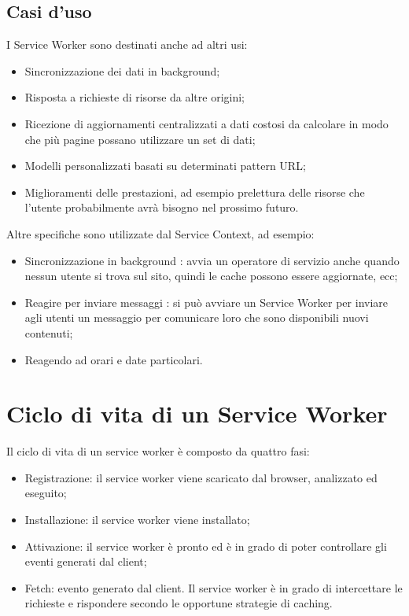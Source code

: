 \documentclass[11pt ,a4paper , twoside , openright ]{article}
\begin{document}
\subsection{Casi d'uso}
I Service Worker sono destinati anche ad altri usi:
\begin{itemize}
	\item Sincronizzazione dei dati in background;
	\item Risposta a richieste di risorse da altre origini;
	\item Ricezione di aggiornamenti centralizzati a dati costosi da calcolare in modo che più pagine possano utilizzare un set di dati;
	\item Modelli personalizzati basati su determinati pattern URL;
	\item Miglioramenti delle prestazioni, ad esempio prelettura delle risorse che l'utente probabilmente avrà bisogno nel prossimo futuro.
\end{itemize}
Altre specifiche sono utilizzate dal Service Context, ad esempio:
\begin{itemize}
	\item Sincronizzazione in background : avvia un operatore di servizio anche quando nessun utente si trova sul sito, quindi le cache possono essere aggiornate, ecc;
	\item Reagire per inviare messaggi : si può avviare un Service Worker per inviare agli utenti un messaggio per comunicare loro che sono disponibili nuovi contenuti;
	\item Reagendo ad orari e date particolari.
\end{itemize}
\newpage
\section{Ciclo di vita di un Service Worker}
Il ciclo di vita di un service worker è composto da quattro fasi:
\begin{itemize}
\item Registrazione: il service worker viene scaricato dal browser, analizzato ed eseguito;
\item Installazione: il service worker viene installato;
\item Attivazione: il service worker è pronto ed è in grado di poter controllare gli eventi generati dal client;
\item Fetch: evento generato dal client. Il service worker è in grado di intercettare le richieste e rispondere secondo le opportune strategie di caching. 
\end{itemize}
\end{document}
